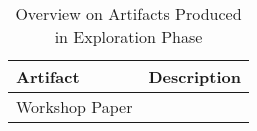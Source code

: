 
\begin{table}[H]
  \label{tbl:phase-1-artifacts}
  \caption{Overview on Artifacts Produced in Exploration Phase}

  \begin{tabular}{|l|l|}
    \hline
    \bf{Artifact}       & \bf{Description} \\ \hline
    Workshop Paper      &                  \\ \hline
  \end{tabular}

\end{table}
